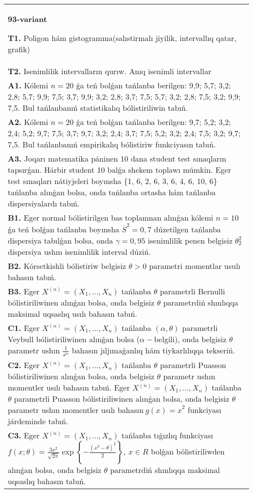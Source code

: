 \documentclass{article}
\begin{document}
\begin{tabular}{m{17cm}}
\textbf{93-variant}
\newline

\textbf{T1.} 
Poligon hám gistogramma(salıstirmalı jiyilik, intervallıq qatar, grafik)
 \\
\textbf{T2.} 
Isenimlilik intervalların qurıw. Anıq isenimli intervallar
 \\
\textbf{A1.} 
Kólemi \(n = 20\) ǵa teń bolǵan tańlanba berilgen: 9,9; 5,7; 3,2; 2,8; 5,7; 9,9; 7,5; 3,7; 9,9; 3,2; 2,8; 3,7; 7,5; 5,7; 3,2; 2,8; 7,5; 3,2; 9,9; 7,5. Bul tańlanbanıń statistikalıq bólistiriliwin tabıń.
 \\
\textbf{A2.} 
Kólemi \(n = 20\) ǵa teń bolǵan tańlanba berilgen: 9,7; 5,2; 3,2; 2,4; 5,2; 9,7; 7,5; 3,7; 9,7; 3,2; 2,4; 3,7; 7,5; 5,2; 3,2; 2,4; 7,5; 3,2; 9,7; 7,5. Bul tańlanbanıń empirikalıq bólistiriw funkciyasın tabıń.
 \\
\textbf{A3.} 
Joqarı matematika páninen 10 dana student test sınaqların tapsırǵan. Hárbir student 10 balǵa shekem toplawı múmkin. Eger test sınaqları nátiyjeleri boyınsha \{1, 6, 2, 6, 3, 6, 4, 6, 10, 6\} tańlanba alınǵan bolsa, onda tańlanba ortasha hám tańlanba dispersiyalardı tabıń.
 \\
\textbf{B1.} 
Eger normal bólistirilgen bas toplamnan alınǵan kólemi \(n = 10\) ǵa teń bolǵan tańlanba boyınsha \({\overline{S}}^{2} = 0,7\) dúzetilgen tańlanba dispersiya tabılǵan bolsa, onda \(\gamma = 0,95\) isenimlilik penen belgisiz \(\theta_{2}^{2}\) dispersiya ushın isenimlilik interval dúziń.
 \\
\textbf{B2.} 
Kórsetkishli bólistiriw belgisiz \(\theta > 0\) parametri momentlar usulı bahasın tabıń.
 \\
\textbf{B3.} 
Eger \(X^{(n)} = \left( X_{1},...,X_{n} \right)\) tańlanba \(\theta\) parametrli Bernulli bólistiriliwinen alınǵan bolsa, onda belgisiz \(\theta\) parametrdiń shınlıqqa maksimal uqsaslıq usılı bahasın tabıń.
 \\
\textbf{C1.} 
Eger \(X^{(n)} = \left( X_{1},...,X_{n} \right)\) tańlanba \((\alpha,\theta)\) parametrli Veybull bólistiriliwinen alınǵan bolsa (\(\alpha -\)belgili), onda belgisiz \(\theta\) parametr ushın \(\frac{1}{\overline{x^{\alpha}}}\) bahasın jıljımaǵanlıq hám tiykarlılıqqa tekseriń.
 \\
\textbf{C2.} 
Eger \(X^{(n)} = \left( X_{1},...,X_{n} \right)\) tańlanba \(\theta\) parametrli Puasson bólistiriliwinen alınǵan bolsa, onda belgisiz \(\theta\) parametr ushın momentler usılı bahasın tabıń. Eger \(X^{(n)} = \left( X_{1},...,X_{n} \right)\) tańlanba \(\theta\) parametrli Puasson bólistiriliwinen alınǵan bolsa, onda belgisiz \(\theta\) parametr ushın momentler usılı bahasın\({\ g(x) = x}^{2}\) funkciyası járdeminde tabıń.
 \\
\textbf{C3.} 
Eger \(X^{(n)} = \left( X_{1},...,X_{n} \right)\) tańlanba tıǵızlıq funkciyası
$f(x;\theta) = \frac{3x^{2}}{\sqrt{2\pi}}\exp\left\{ - \frac{\left( x^{3} - \theta \right)^{2}}{2} \right\},\ x \in R$
bolǵan bólistiriliwden alınǵan bolsa, onda belgisiz \(\theta\) parametrdiń shınlıqqa maksimal uqsaslıq bahasın tabıń.
 \\

\end{tabular}
\end{document}
